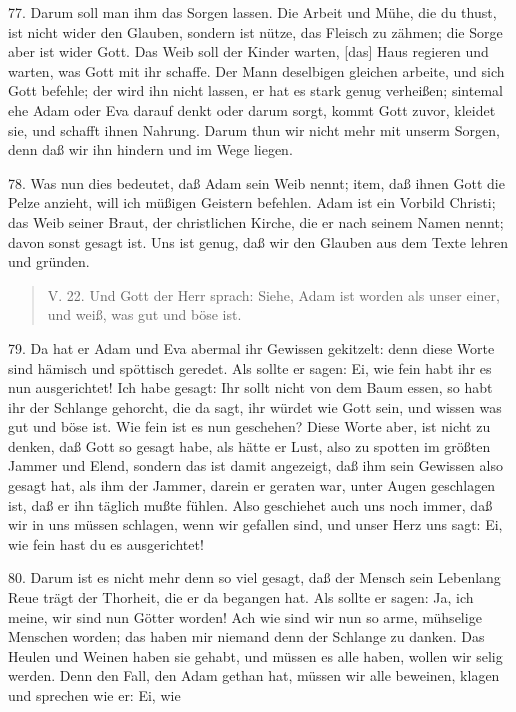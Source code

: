 77. Darum soll man ihm das Sorgen lassen. Die Arbeit und Mühe, die du thust, ist nicht wider den Glauben, sondern ist nütze, das Fleisch zu zähmen; die Sorge aber ist wider Gott. Das Weib soll der Kinder warten, [das] Haus regieren und warten, was Gott mit ihr schaffe. Der Mann deselbigen gleichen arbeite, und sich Gott befehle; der wird ihn nicht lassen, er hat es stark genug verheißen; sintemal ehe Adam oder Eva darauf denkt oder darum sorgt, kommt Gott zuvor, kleidet sie, und schafft ihnen Nahrung. Darum thun wir nicht mehr mit unserm Sorgen, denn daß wir ihn hindern und im Wege liegen.

78. Was nun dies bedeutet, daß Adam sein Weib nennt; item, daß ihnen Gott die Pelze anzieht, will ich müßigen Geistern befehlen. Adam ist ein Vorbild Christi; das Weib seiner Braut, der christlichen Kirche, die er nach seinem Namen nennt; davon sonst gesagt ist. Uns ist genug, daß wir den Glauben aus dem Texte lehren und gründen.

\begin{quote}
V. 22. Und Gott der Herr sprach: Siehe, Adam ist worden als unser einer, und weiß, was gut und böse ist.
\end{quote}

79. Da hat er Adam und Eva abermal ihr Gewissen gekitzelt: denn diese Worte sind hämisch und spöttisch geredet. Als sollte er sagen: Ei, wie fein habt ihr es nun ausgerichtet! Ich habe gesagt: Ihr sollt nicht von dem Baum essen, so habt ihr der Schlange gehorcht, die da sagt, ihr würdet wie Gott sein, und wissen was gut und böse ist. Wie fein ist es nun geschehen? Diese Worte aber, ist nicht zu denken, daß Gott so gesagt habe, als hätte er Lust, also zu spotten im größten Jammer und Elend, sondern das ist damit angezeigt, daß ihm sein Gewissen also gesagt hat, als ihm der Jammer, darein er geraten war, unter Augen geschlagen ist, daß er ihn täglich mußte fühlen. Also geschiehet auch uns noch immer, daß wir in uns müssen schlagen, wenn wir gefallen sind, und unser Herz uns sagt: Ei, wie fein hast du es ausgerichtet!

80. Darum ist es nicht mehr denn so viel gesagt, daß der Mensch sein Lebenlang Reue trägt der Thorheit, die er da begangen hat. Als sollte er sagen: Ja, ich meine, wir sind nun Götter worden! Ach wie sind wir nun so arme, mühselige Menschen worden; das haben mir niemand denn der Schlange zu danken. Das Heulen und Weinen haben sie gehabt, und müssen es alle haben, wollen wir selig werden. Denn den Fall, den Adam gethan hat, müssen wir alle beweinen, klagen und sprechen wie er: Ei, wie
